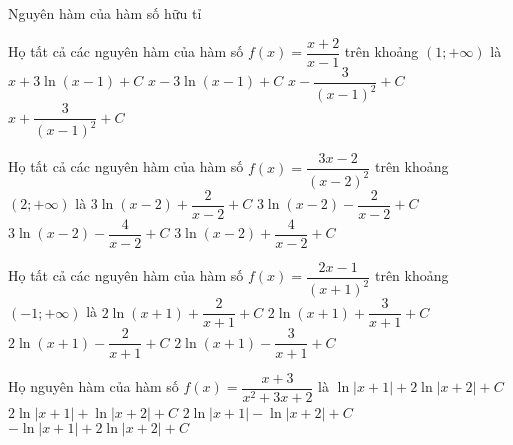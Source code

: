 \begin{dang}
	{Nguyên hàm của hàm số hữu tỉ}
\end{dang}
\begin{ex}
	Họ tất cả các nguyên hàm của hàm số $ f(x)=\dfrac{x+2}{x-1}$ trên khoảng $\left(1;+\infty\right)$ là
	\choice
	{\True $ x+3\ln\left(x-1\right)+C$}
	{$ x-3\ln\left(x-1\right)+C$}
	{$ x-\dfrac{3}{\left(x-1\right)^2}+C$}
	{$ x+\dfrac{3}{\left(x-1\right)^2}+C$}
\end{ex}
\begin{ex}
	[Mã đề 104 - BGD - 2019]%
	Họ tất cả các nguyên hàm của hàm số $ f(x)=\dfrac{3x-2}{\left(x-2\right)^2}$ trên khoảng $\left(2;+\infty\right)$ là
	\choice
	{$ 3\ln\left(x-2\right)+\dfrac{2}{x-2}+C$}
	{$ 3\ln\left(x-2\right)-\dfrac{2}{x-2}+C$}
	{\True $ 3\ln\left(x-2\right)-\dfrac{4}{x-2}+C$}
	{$ 3\ln\left(x-2\right)+\dfrac{4}{x-2}+C$}
\end{ex}
\begin{ex}
	[Mã đề 101 - BGD - 2019]%
	Họ tất cả các nguyên hàm của hàm số $ f(x)=\dfrac{2x-1}{\left(x+1\right)^2}$ trên khoảng$\left(-1;+\infty\right)$ là
	\choice
	{$ 2\ln\left(x+1\right)+\dfrac{2}{x+1}+C$}
	{\True $ 2\ln\left(x+1\right)+\dfrac{3}{x+1}+C$}
	{$ 2\ln\left(x+1\right)-\dfrac{2}{x+1}+C$}
	{$ 2\ln\left(x+1\right)-\dfrac{3}{x+1}+C$}
\end{ex}
\begin{ex}
	Họ nguyên hàm của hàm số $ f(x)=\dfrac{x+3}{x^2+3x+2}$ là
	\choice
	{$\ln\left| x+1\right|+2\ln\left| x+2\right|+C$}
	{$ 2\ln\left| x+1\right|+\ln\left| x+2\right|+C$}
	{\True $ 2\ln\left| x+1\right|-\ln\left| x+2\right|+C$}
	{$-\ln\left| x+1\right|+2\ln\left| x+2\right|+C$}
\end{ex}
